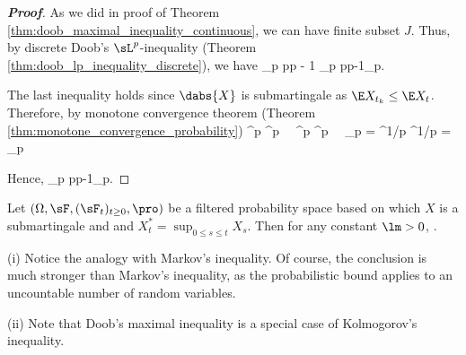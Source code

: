 \begin{proof}[\bf Proof]
As we did in proof of Theorem \ref{thm:doob_maximal_inequality_continuous}, we can have finite subset $J$. Thus, by discrete Doob's $\sL^p$-inequality (Theorem \ref{thm:doob_lp_inequality_discrete}), we have
\be
{}_p \leq \frac p{p - 1} _p \leq \frac p{p-1}_p.
\ee

The last inequality holds since $\dabs{X}$ is submartingale as $\E X_{t_k} \leq \E X_t$. %
Therefore, by monotone convergence theorem (Theorem \ref{thm:monotone_convergence_probability})
\be
{}^p \ua {}^p \ \ra \ \E{}^p \ua \E{}^p \ \ra \ _p = ^{1/p} \ua {}^{1/p} = _p\nonumber
\ee

Hence,
\be
{}_p \leq \frac p{p-1}_p.%
\ee%
\end{proof}



\begin{theorem}\label{thm:kolmogorov_inequality_continuous_time_martingale}
Let $(\Omega,\sF,(\sF_t)_{t\geq 0},\pro)$ be a filtered probability space based on which $X$ is a submartingale and and $X^*_t = \sup_{0\leq s\leq t} X_s$. Then for any constant $\lm >0$,
\be
\pro{} \leq {}.
\ee
\end{theorem}

\begin{remark}
\ben
\item [(i)] Notice the analogy with Markov's inequality. Of course, the conclusion is much stronger than Markov's inequality, as the probabilistic bound applies to an uncountable number of random variables.
\item [(ii)] Note that Doob's maximal inequality is a special case of Kolmogorov's inequality.
\een
\end{remark}

